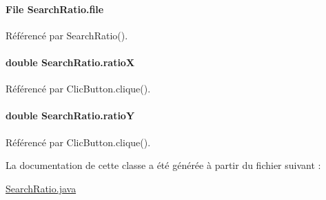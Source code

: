 \paragraph[{file}]{\setlength{\rightskip}{0pt plus 5cm}File Search\+Ratio.\+file\hspace{0.3cm}{\ttfamily [package]}}\label{classSearchRatio_a06393eaf84ff3e3f8c7f48e91b0b5e6a}


Référencé par Search\+Ratio().

\hypertarget{classSearchRatio_a0310652e5c5da25ebb2eeabe4f90308a}{}
\paragraph[{ratio\+X}]{\setlength{\rightskip}{0pt plus 5cm}double Search\+Ratio.\+ratio\+X\hspace{0.3cm}{\ttfamily [package]}}\label{classSearchRatio_a0310652e5c5da25ebb2eeabe4f90308a}


Référencé par Clic\+Button.\+clique().

\hypertarget{classSearchRatio_a0c0087388c099310eee409fb48bcef00}{}
\paragraph[{ratio\+Y}]{\setlength{\rightskip}{0pt plus 5cm}double Search\+Ratio.\+ratio\+Y\hspace{0.3cm}{\ttfamily [package]}}\label{classSearchRatio_a0c0087388c099310eee409fb48bcef00}


Référencé par Clic\+Button.\+clique().



La documentation de cette classe a été générée à partir du fichier suivant \+:\begin{DoxyCompactItemize}
\item 
\hyperlink{SearchRatio_8java}{Search\+Ratio.\+java}\end{DoxyCompactItemize}
